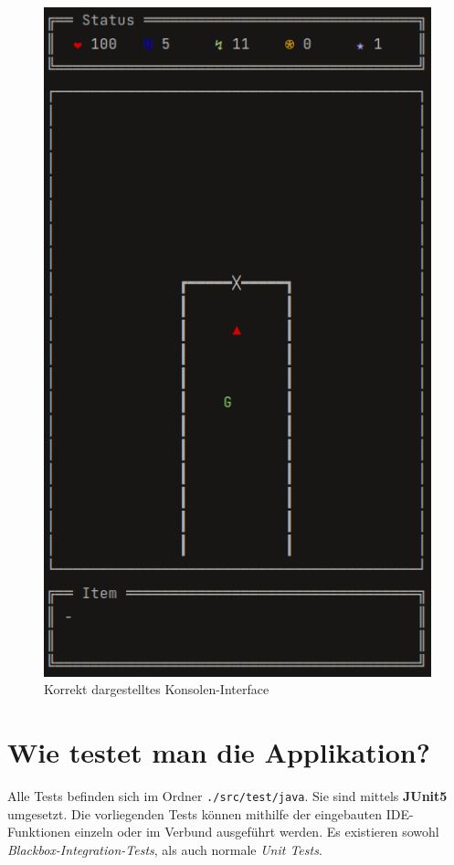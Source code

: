 \vspace{0.5cm}
\begin{figure}[H]
    \centering
    \includegraphics[width=0.6\linewidth]{Bilder/Visualisierung/GameLook.png}
    \caption{Korrekt dargestelltes Konsolen-Interface}
\end{figure}

\section{Wie testet man die Applikation?}
Alle Tests befinden sich im Ordner \texttt{./src/test/java}.
Sie sind mittels \textbf{JUnit5} umgesetzt. Die vorliegenden Tests
können mithilfe der eingebauten IDE-Funktionen einzeln oder im
Verbund ausgeführt werden. Es existieren sowohl
\textit{Blackbox-Integration-Tests}, als auch normale
\textit{Unit Tests}.
